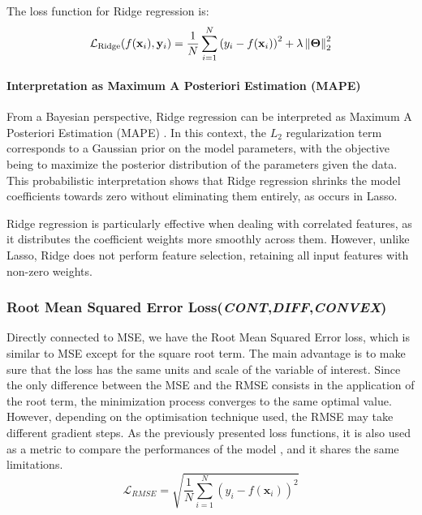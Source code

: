 \documentclass[sn-mathphys-num]{sn-jnl}%
\newcommand \cont{\textit{CONT}}
\newcommand \diff{\textit{DIFF}}
\newcommand \conv{\textit{CONVEX}}
\renewcommand\vec{\mathbf}
\begin{document}
The loss function for Ridge regression is:
\begin{equation}\label{ridge_loss}
    \mathcal{L}_{\text{Ridge}}(f(\vec{x}_i),\vec{y}_i)  = \frac{1}{N} \sum_{i=1}^{N} \left ( y_i - f(\vec{x}_i) \right )^{2} + \lambda \norm{\vec{\Theta}}_2^2
\end{equation}

\paragraph{Interpretation as Maximum A Posteriori Estimation (MAPE)}
From a Bayesian perspective, Ridge regression can be interpreted as Maximum A Posteriori Estimation (MAPE) \cite{murphy2013machine}. In this context, the $L_2$ regularization term corresponds to a Gaussian prior on the model parameters, with the objective being to maximize the posterior distribution of the parameters given the data. This probabilistic interpretation shows that Ridge regression shrinks the model coefficients towards zero without eliminating them entirely, as occurs in Lasso.

Ridge regression is particularly effective when dealing with correlated features, as it distributes the coefficient weights more smoothly across them. However, unlike Lasso, Ridge does not perform feature selection, retaining all input features with non-zero weights.

    
    \subsubsection{Root Mean Squared Error Loss(\cont,\diff,\conv)}\label{subsubsec-regression_RMSE}
    Directly connected to MSE, we have the Root Mean Squared Error loss, which is similar to MSE except for the square root term. 
    The main advantage is to make sure that the loss has the same units and scale of the variable of interest. 
    Since the only difference between the MSE and the RMSE consists in the application of the root term, the minimization process converges to the same optimal value. However, depending on the optimisation technique used, the RMSE may take different gradient steps. As the previously presented loss functions, it is also used as a metric to compare the performances of the model \cite{valipour2013comparison,li2010comparing}, and it shares the same limitations.
    \begin{equation}
        \mathcal{L}_{RMSE} = \sqrt{\frac{1}{N} \sum_{i=1}^{N} \left ( y_i - f(\vec{x}_i) \right )^{2}}
    \end{equation}
\end{document}
